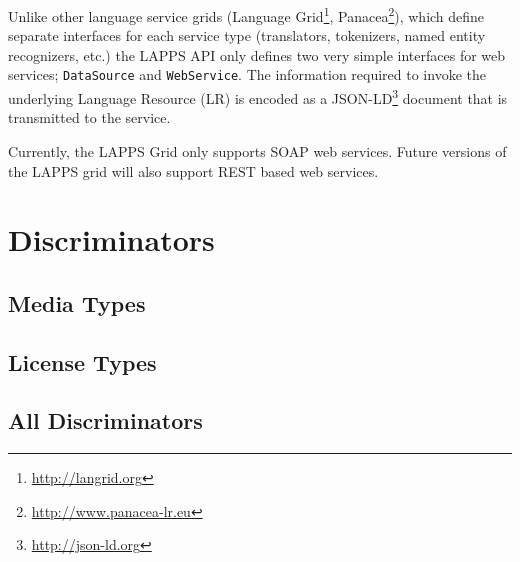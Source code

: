\documentclass{article}
\newcommand{\lapps}{LAPPS\xspace}
\newcommand{\source}{\texttt{DataSource}\xspace}
\newcommand{\service}{\texttt{WebService}\xspace}
\begin{document}
Unlike other language service grids (Language Grid\footnote{\url{http://langrid.org}}, Panacea\footnote{\url{http://www.panacea-lr.eu}}), which define separate interfaces for each service type (translators, tokenizers, named entity recognizers, etc.) the \lapps API only defines two very simple interfaces for web services; \source and \service. The information required to invoke the underlying Language Resource (LR) is encoded as a JSON-LD\footnote{\url{http://json-ld.org}} document that is transmitted to the service.

Currently, the \lapps Grid only supports SOAP\cite{soap} web services. Future versions of the \lapps grid will also support REST based web services.








\section{Discriminators}\label{sec:discriminators}

\subsection{Media Types}\label{sub:media}


\subsection{License Types}\label{sub:licenses}


\subsection{All Discriminators}\label{sub:discriminators}




\end{document}
